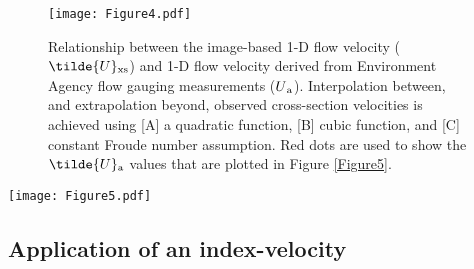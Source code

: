 \documentclass[hess, manuscript]{copernicus} %
\begin{document}
\begin{figure}[H]
\centering 
\texttt{[image: Figure4.pdf]}
\caption{Relationship between the image-based 1-D flow velocity ($\tilde{U}\textsubscript{xs}$) and 1-D flow velocity derived from Environment Agency flow gauging measurements ($U\textsubscript{a}$). Interpolation between, and extrapolation beyond, observed cross-section velocities is achieved using [A] a quadratic function, [B] cubic function, and [C] constant Froude number assumption. Red dots are used to show the $\tilde{U}\textsubscript{a}$ values that are plotted in Figure \ref{Figure5}.}
\label{Figure4} 
\end{figure}

\begin{figure*}[!htb]
\centering\Large
\texttt{[image: Figure5.pdf]}
\caption{A selection of cross-section velocities illustrating the deviation between the Sontek aDcp velocity magnitudes (grey circles) and KLT-IV generated velocities for a range of flow conditions. Measured velocities are shown by the red filled circles, whereas estimates based on the constant Froude number assumption are shown by the red open circles. Error bars illustrate the standard deviation of stationary aDcp measurements. Flow discharge measurements for the aDcp transects are presented in each subplot along with the percent difference between discharge reported by aDcp and the reconstructed discharge using KLT-IV.}
\label{Figure5} 
\end{figure*}

\FloatBarrier

\subsection{Application of an index-velocity}
\end{document}
